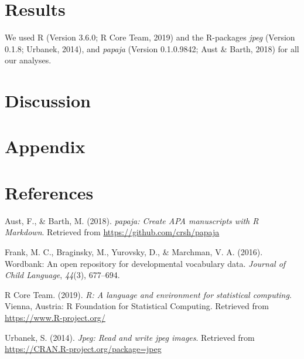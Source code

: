 \documentclass[man,floatsintext]{apa6}
\begin{document}
\hypertarget{results}{%
\section{Results}\label{results}}

We used R (Version 3.6.0; R Core Team, 2019) and the R-packages \emph{jpeg} (Version 0.1.8; Urbanek, 2014), and \emph{papaja} (Version 0.1.0.9842; Aust \& Barth, 2018) for all our analyses.

\hypertarget{discussion}{%
\section{Discussion}\label{discussion}}

\hypertarget{appendix}{%
\section{Appendix}\label{appendix}}

\newpage

\hypertarget{references}{%
\section{References}\label{references}}

\begingroup
\setlength{\parindent}{-0.5in}
\setlength{\leftskip}{0.5in}

\hypertarget{refs}{}
\leavevmode\hypertarget{ref-R-papaja}{}%
Aust, F., \& Barth, M. (2018). \emph{papaja: Create APA manuscripts with R Markdown}. Retrieved from \url{https://github.com/crsh/papaja}

\leavevmode\hypertarget{ref-frank2016wordbank}{}%
Frank, M. C., Braginsky, M., Yurovsky, D., \& Marchman, V. A. (2016). Wordbank: An open repository for developmental vocabulary data. \emph{Journal of Child Language}, \emph{44}(3), 677--694.

\leavevmode\hypertarget{ref-R-base}{}%
R Core Team. (2019). \emph{R: A language and environment for statistical computing}. Vienna, Austria: R Foundation for Statistical Computing. Retrieved from \url{https://www.R-project.org/}

\leavevmode\hypertarget{ref-R-jpeg}{}%
Urbanek, S. (2014). \emph{Jpeg: Read and write jpeg images}. Retrieved from \url{https://CRAN.R-project.org/package=jpeg}

\endgroup
\end{document}
